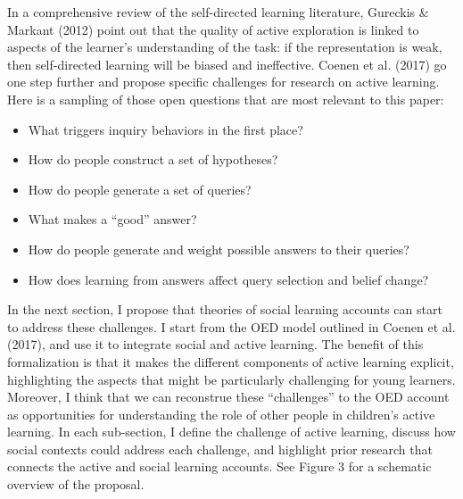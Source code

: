 \documentclass[oneside]{report}
\begin{document}
In a comprehensive review of the self-directed learning literature,
Gureckis \& Markant (2012) point out that the quality of active
exploration is linked to aspects of the learner's understanding of the
task: if the representation is weak, then self-directed learning will be
biased and ineffective. Coenen et al. (2017) go one step further and
propose specific challenges for research on active learning. Here is a
sampling of those open questions that are most relevant to this paper:
\begin{itemize}
\tightlist
\item
  What triggers inquiry behaviors in the first place?
\item
  How do people construct a set of hypotheses?
\item
  How do people generate a set of queries?
\item
  What makes a ``good'' answer?
\item
  How do people generate and weight possible answers to their queries?
\item
  How does learning from answers affect query selection and belief
  change?
\end{itemize}
\noindent In the next section, I propose that theories of social
learning accounts can start to address these challenges. I start from
the OED model outlined in Coenen et al. (2017), and use it to integrate
social and active learning. The benefit of this formalization is that it
makes the different components of active learning explicit, highlighting
the aspects that might be particularly challenging for young learners.
Moreover, I think that we can reconstrue these ``challenges'' to the OED
account as opportunities for understanding the role of other people in
children's active learning. In each sub-section, I define the challenge
of active learning, discuss how social contexts could address each
challenge, and highlight prior research that connects the active and
social learning accounts. See Figure 3 for a schematic overview of the
proposal.

\end{document}
